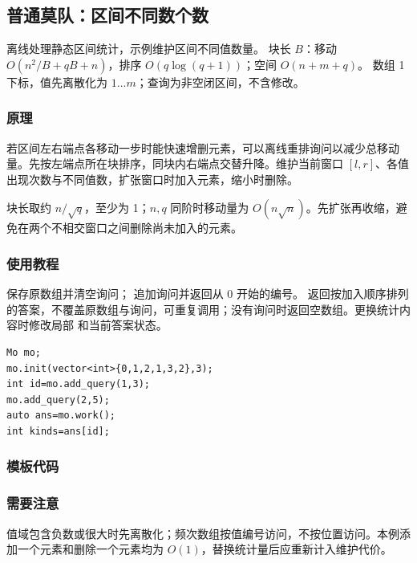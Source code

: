 \subsection{普通莫队：区间不同数个数}
\label{ds:mo}
\AlgorithmInfo
    {离线处理静态区间统计，示例维护区间不同值数量。}
    {块长 $B$：移动 $O(n^2/B+qB+n)$，排序 $O(q\log(q+1))$；空间 $O(n+m+q)$。}
    {数组 1 下标，值先离散化为 $1\ldots m$；查询为非空闭区间，不含修改。}
\subsubsection*{原理}
若区间左右端点各移动一步时能快速增删元素，可以离线重排询问以减少总移动量。先按左端点所在块排序，同块内右端点交替升降。维护当前窗口 $[l,r]$、各值出现次数与不同值数，扩张窗口时加入元素，缩小时删除。

块长取约 $n/\sqrt q$，至少为 1；$n,q$ 同阶时移动量为 $O(n\sqrt n)$。先扩张再收缩，避免在两个不相交窗口之间删除尚未加入的元素。

\subsubsection*{使用教程}
 保存原数组并清空询问； 追加询问并返回从 0 开始的编号。 返回按加入顺序排列的答案，不覆盖原数组与询问，可重复调用；没有询问时返回空数组。更换统计内容时修改局部  和当前答案状态。
\begin{lstlisting}[style=mtycpp,numbers=none]
Mo mo;
mo.init(vector<int>{0,1,2,1,3,2},3);
int id=mo.add_query(1,3);
mo.add_query(2,5);
auto ans=mo.work();
int kinds=ans[id];
\end{lstlisting}
\subsubsection*{模板代码}
\subsubsection*{需要注意}
值域包含负数或很大时先离散化；频次数组按值编号访问，不按位置访问。本例添加一个元素和删除一个元素均为 $O(1)$，替换统计量后应重新计入维护代价。
